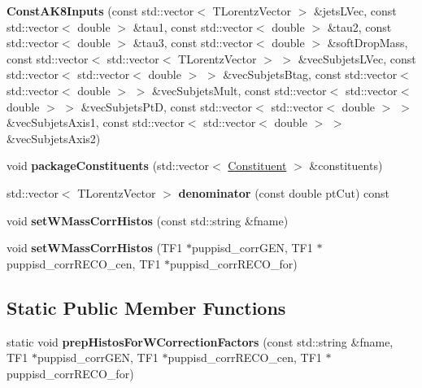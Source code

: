 \begin{DoxyCompactItemize}
\item 
\hypertarget{classttUtility_1_1ConstAK8Inputs_ae5fd5c76e23777e435f4dafdd25b4c75}{{\bfseries Const\-A\-K8\-Inputs} (const std\-::vector$<$ T\-Lorentz\-Vector $>$ \&jets\-L\-Vec, const std\-::vector$<$ double $>$ \&tau1, const std\-::vector$<$ double $>$ \&tau2, const std\-::vector$<$ double $>$ \&tau3, const std\-::vector$<$ double $>$ \&soft\-Drop\-Mass, const std\-::vector$<$ std\-::vector$<$ T\-Lorentz\-Vector $>$ $>$ \&vec\-Subjets\-L\-Vec, const std\-::vector$<$ std\-::vector$<$ double $>$ $>$ \&vec\-Subjets\-Btag, const std\-::vector$<$ std\-::vector$<$ double $>$ $>$ \&vec\-Subjets\-Mult, const std\-::vector$<$ std\-::vector$<$ double $>$ $>$ \&vec\-Subjets\-Pt\-D, const std\-::vector$<$ std\-::vector$<$ double $>$ $>$ \&vec\-Subjets\-Axis1, const std\-::vector$<$ std\-::vector$<$ double $>$ $>$ \&vec\-Subjets\-Axis2)}\label{classttUtility_1_1ConstAK8Inputs_ae5fd5c76e23777e435f4dafdd25b4c75}

\item 
\hypertarget{classttUtility_1_1ConstAK8Inputs_a8ed6e23d77aec6b257c6cd2c383e41a1}{void {\bfseries package\-Constituents} (std\-::vector$<$ \hyperlink{classConstituent}{Constituent} $>$ \&constituents)}\label{classttUtility_1_1ConstAK8Inputs_a8ed6e23d77aec6b257c6cd2c383e41a1}

\item 
\hypertarget{classttUtility_1_1ConstAK8Inputs_acf5080a09bbaf261d42cba91e6d5274a}{std\-::vector$<$ T\-Lorentz\-Vector $>$ {\bfseries denominator} (const double pt\-Cut) const }\label{classttUtility_1_1ConstAK8Inputs_acf5080a09bbaf261d42cba91e6d5274a}

\item 
\hypertarget{classttUtility_1_1ConstAK8Inputs_a331aa8e6bbefade26efd24be32ad1b5d}{void {\bfseries set\-W\-Mass\-Corr\-Histos} (const std\-::string \&fname)}\label{classttUtility_1_1ConstAK8Inputs_a331aa8e6bbefade26efd24be32ad1b5d}

\item 
\hypertarget{classttUtility_1_1ConstAK8Inputs_a64b27b878a5c341b37defe5637b554fc}{void {\bfseries set\-W\-Mass\-Corr\-Histos} (T\-F1 $\ast$puppisd\-\_\-corr\-G\-E\-N, T\-F1 $\ast$puppisd\-\_\-corr\-R\-E\-C\-O\-\_\-cen, T\-F1 $\ast$puppisd\-\_\-corr\-R\-E\-C\-O\-\_\-for)}\label{classttUtility_1_1ConstAK8Inputs_a64b27b878a5c341b37defe5637b554fc}

\end{DoxyCompactItemize}
\subsection*{Static Public Member Functions}
\begin{DoxyCompactItemize}
\item 
\hypertarget{classttUtility_1_1ConstAK8Inputs_a9f18c082d4f1a3f031b1b99ed0ab775f}{static void {\bfseries prep\-Histos\-For\-W\-Correction\-Factors} (const std\-::string \&fname, T\-F1 $\ast$puppisd\-\_\-corr\-G\-E\-N, T\-F1 $\ast$puppisd\-\_\-corr\-R\-E\-C\-O\-\_\-cen, T\-F1 $\ast$puppisd\-\_\-corr\-R\-E\-C\-O\-\_\-for)}\label{classttUtility_1_1ConstAK8Inputs_a9f18c082d4f1a3f031b1b99ed0ab775f}

\end{DoxyCompactItemize}

